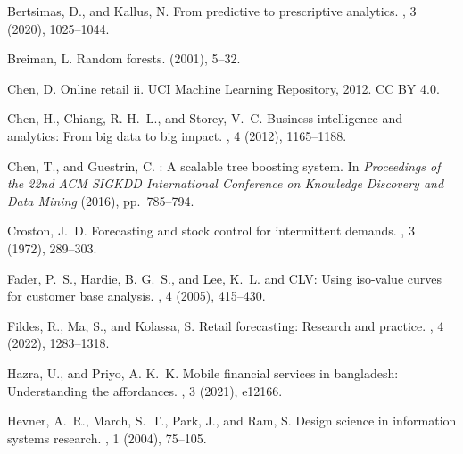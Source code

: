 \documentclass[a4paper,11pt,oneside]{book}
\makeatletter
\newcommand\bhrule{\typeout{------------------------------------------------------------------------------}}
\newcommand\btypeout[1]{\bhrule\typeout{\space #1}\bhrule}
\def\cleardoublepage{\clearpage\if@twoside \ifodd\c@page\else
\hbox{}
\thispagestyle{empty}
\newpage
\if@twocolumn\hbox{}\newpage\fi\fi\fi}
\theoremstyle{plain}
\theoremstyle{definition}
\theoremstyle{remark}
\newcounter{dummy}
\newcommand\addtotoc[1]{
\refstepcounter{dummy}
\addcontentsline{toc}{chapter}{#1}}
\renewcommand\backmatter{
  \if@openright
    \cleardoublepage
  \else
    \clearpage
  \fi
  \addtotoc{\bibname}
  \btypeout{\bibname}
  \@mainmatterfalse}
\renewcommand{\newblock}{\hspace{0.25em}}%
\makeatother
\begin{document}
\backmatter
\label{Bibliography}
\begin{thebibliography}{10}

{\sc Bertsimas, D., and Kallus, N.}
\newblock From predictive to prescriptive analytics.
\newblock {\em Management Science 66}, 3 (2020), 1025--1044.

{\sc Breiman, L.}
\newblock Random forests.
\newblock {\em Machine Learning 45\/} (2001), 5--32.

{\sc Chen, D.}
\newblock Online retail ii.
\newblock UCI Machine Learning Repository, 2012.
\newblock CC BY 4.0.

{\sc Chen, H., Chiang, R. H.~L., and Storey, V.~C.}
\newblock Business intelligence and analytics: From big data to big impact.
\newblock {\em MIS Quarterly 36}, 4 (2012), 1165--1188.

{\sc Chen, T., and Guestrin, C.}
\newblock {XGBoost}: A scalable tree boosting system.
\newblock In {\em Proceedings of the 22nd ACM SIGKDD International Conference
  on Knowledge Discovery and Data Mining\/} (2016), pp.~785--794.

{\sc Croston, J.~D.}
\newblock Forecasting and stock control for intermittent demands.
\newblock {\em Operational Research Quarterly 23}, 3 (1972), 289--303.

{\sc Fader, P.~S., Hardie, B. G.~S., and Lee, K.~L.}
\newblock {RFM} and {CLV}: Using iso-value curves for customer base analysis.
\newblock {\em Journal of Marketing Research 42}, 4 (2005), 415--430.

{\sc Fildes, R., Ma, S., and Kolassa, S.}
\newblock Retail forecasting: Research and practice.
\newblock {\em International Journal of Forecasting 38}, 4 (2022), 1283--1318.

{\sc Hazra, U., and Priyo, A. K.~K.}
\newblock Mobile financial services in bangladesh: Understanding the
  affordances.
\newblock {\em The Electronic Journal of Information Systems in Developing
  Countries 87}, 3 (2021), e12166.

{\sc Hevner, A.~R., March, S.~T., Park, J., and Ram, S.}
\newblock Design science in information systems research.
\newblock {\em MIS Quarterly 28}, 1 (2004), 75--105.


\end{thebibliography}
\end{document}
